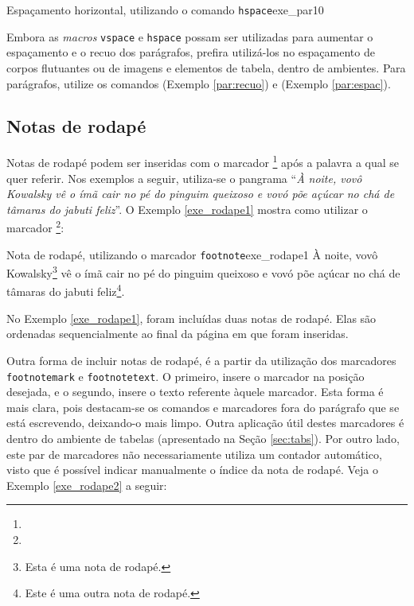 \begin{texexptitled}[breakable,enhanced,middle=2mm]{Espaçamento horizontal, utilizando o comando {\tt hspace}}{exe_par10}
\hspace{2cm}\lipsumsentence[36-37] \\ 
\lipsumsentence[38-39]
\end{texexptitled}

Embora as \textit{macros} {\tt vspace} e {\tt hspace} possam ser utilizadas para aumentar o espaçamento e o recuo dos parágrafos, prefira utilizá-los no espaçamento de corpos flutuantes ou de imagens e elementos de tabela, dentro de ambientes. Para parágrafos, utilize os comandos \texttt{\parskip} (Exemplo \ref{par:recuo}) e \texttt{\parindent} (Exemplo \ref{par:espac}).

\subsection{Notas de rodapé}
\label{sec:notas_rodape}

Notas de rodapé podem ser inseridas com o marcador \texttt{\footnote{}} após a palavra a qual se quer referir. Nos exemplos a seguir, utiliza-se o pangrama\footnotemark{} ``\textit{À noite, vovô Kowalsky vê o ímã cair no pé do pinguim queixoso e vovó põe açúcar no chá de tâmaras do jabuti feliz\footnotemark{}}''. O Exemplo \ref{exe_rodape1} mostra como utilizar o marcador \texttt{\footnote{}}:

\begin{texexptitled}[breakable,enhanced,middle=2mm]{Nota de rodapé, utilizando o marcador {\tt footnote}}{exe_rodape1}
À noite, vovô Kowalsky\footnote{Esta é uma nota de rodapé.} vê o ímã cair no pé do pinguim queixoso e vovó põe açúcar no chá de tâmaras do jabuti feliz\footnote{Este é uma outra nota de rodapé.}.
\end{texexptitled}

\addtocounter{footnote}{-2}

No Exemplo \ref{exe_rodape1}, foram incluídas duas notas de rodapé. Elas são ordenadas sequencialmente ao final da página em que foram inseridas.

Outra forma de incluir notas de rodapé, é a partir da utilização dos marcadores {\tt footnotemark} e {\tt footnotetext}. O primeiro, insere o marcador na posição desejada, e o segundo, insere o texto referente àquele marcador. Esta forma é mais clara, pois destacam-se os comandos e marcadores fora do parágrafo que se está escrevendo, deixando-o mais limpo. Outra aplicação útil destes marcadores é dentro do ambiente de tabelas (apresentado na Seção \ref{sec:tabs}). Por outro lado, este par de marcadores não necessariamente utiliza um contador automático, visto que é possível indicar manualmente o índice da nota de rodapé. Veja o Exemplo \ref{exe_rodape2} a seguir:

